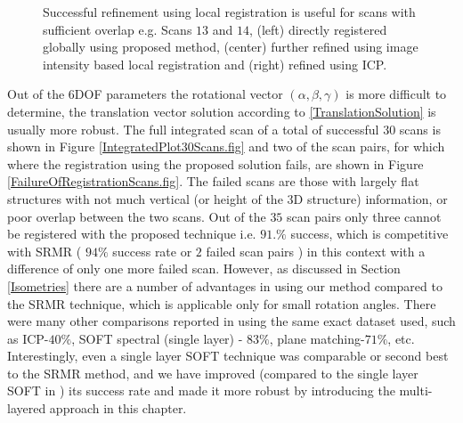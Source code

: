 \documentclass{UCF_ETD}
\begin{document}
\begin{figure}[H]
\begin{center}
\caption{ Successful refinement using local registration is useful for scans with sufficient overlap e.g. Scans $13$ and $14$, (left) directly registered globally using proposed method, (center) further refined using image intensity based local registration and (right) refined using ICP.}
\label{Scan13_14Registeration.fig}
\end{center}
\end{figure}

Out of the $6$DOF parameters the rotational vector $(\alpha,\beta,\gamma)$ is more difficult to determine, the translation vector solution according to \eqref{TranslationSolution} is usually more robust. %
The full integrated scan of a total of successful $30$ scans is shown in Figure \ref{IntegratedPlot30Scans.fig} and  two of the scan pairs, for which where the registration using the proposed solution fails, are shown in Figure \ref{FailureOfRegistrationScans.fig}. The failed scans are those with largely flat structures with not much vertical (or height of the $3$D structure) information, or poor overlap between the two scans. Out of the $35$ scan pairs only three cannot be registered with the proposed technique i.e. $91.\%$ success, which is competitive with SRMR ( $94 \%$ success rate or $2$ failed scan pairs ) in this context with a difference of only one more failed scan. However, as discussed in Section \ref{Isometries} there are a number of advantages in using our method compared to the SRMR technique, which is applicable only for small rotation angles. There were many other comparisons reported in \cite{Bulow2013} using the same exact dataset used, such as ICP-$40 \%$, SOFT spectral (single layer) \cite{Kostelec2008}- $83\%$, plane matching-$71 \%$, etc. Interestingly, even a single layer SOFT technique was comparable or second best to the SRMR method, and we have improved (compared to the single layer SOFT in \cite{Kostelec2008}) its success rate and made it more robust by introducing the multi-layered approach in this chapter. 
\end{document}

